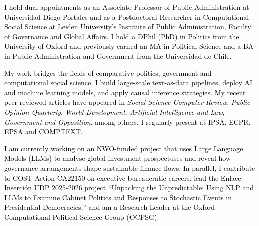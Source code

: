 




\vspace{3mm}

\begin{cvparagraph}

\textcolor{black}{I hold dual appointments as an Associate Professor of Public Administration at Universidad Diego Portales and as a Postdoctoral Researcher in Computational Social Science at Leiden University’s Institute of Public Administration, Faculty of Governance and Global Affairs. I hold a DPhil (PhD) in Politics from the University of Oxford and previously earned an MA in Political Science and a BA in Public Administration and Government from the Universidad de Chile.}

\textcolor{black}{My work bridges the fields of comparative politics, government and computational social science. I build large-scale text-as-data pipelines, deploy AI and machine learning models, and apply causal inference strategies. My recent peer-reviewed articles have appeared in {\itshape Social Science Computer Review}, {\itshape Public Opinion Quarterly}, {\itshape World Development}, {\itshape Artificial Intelligence and Law}, {\itshape Government and Opposition}, among others. I regularly present at IPSA, ECPR, EPSA and COMPTEXT.}

\textcolor{black}{I am currently working on an NWO-funded project that uses Large Language Models (LLMs) to analyse global investment prospectuses and reveal how governance arrangements shape sustainable finance flows. In parallel, I contribute to COST Action CA22150 on executive-bureaucratic careers, lead the Enlace-Inserción UDP 2025-2026 project “Unpacking the Unpredictable: Using NLP and LLMs to Examine Cabinet Politics and Responses to Stochastic Events in Presidential Democracies,” and am a Research Leader at the Oxford Computational Political Science Group (OCPSG).}
\vspace{1mm}
\end{cvparagraph}
